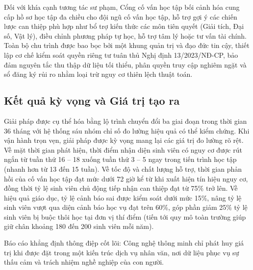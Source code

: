 Đối với khía cạnh tương tác sư phạm, Cổng cố vấn học tập bối cảnh hóa cung cấp hồ sơ học tập đa chiều cho đội ngũ cố vấn học tập, hỗ trợ gợi ý các chiến lược can thiệp phù hợp như bổ trợ kiến thức các môn tiên quyết (Giải tích, Đại số, Vật lý), điều chỉnh phương pháp tự học, hỗ trợ tâm lý hoặc tư vấn tài chính. Toàn bộ chu trình được bao bọc bởi một khung quản trị và đạo đức tin cậy, thiết lập cơ chế kiểm soát quyền riêng tư tuân thủ Nghị định 13/2023/NĐ-CP, bảo đảm nguyên tắc thu thập dữ liệu tối thiểu, phân quyền truy cập nghiêm ngặt và sổ đăng ký rủi ro nhằm loại trừ nguy cơ thiên lệch thuật toán.

\subsection*{Kết quả kỳ vọng và Giá trị tạo ra}
Giải pháp được cụ thể hóa bằng lộ trình chuyển đổi ba giai đoạn trong thời gian 36 tháng với hệ thống sáu nhóm chỉ số đo lường hiệu quả có thể kiểm chứng. Khi vận hành trọn vẹn, giải pháp được kỳ vọng mang lại các giá trị đo lường rõ rệt. Về mặt thời gian phát hiện, thời điểm nhận diện sinh viên có nguy cơ được rút ngắn từ tuần thứ 16 -- 18 xuống tuần thứ 3 -- 5 ngay trong tiến trình học tập (nhanh hơn từ 13 đến 15 tuần). Về tốc độ và chất lượng hỗ trợ, thời gian phản hồi của cố vấn học tập đạt mức dưới 72 giờ kể từ khi xuất hiện tín hiệu nguy cơ, đồng thời tỷ lệ sinh viên chủ động tiếp nhận can thiệp đạt từ 75\% trở lên. Về hiệu quả giáo dục, tỷ lệ cảnh báo sai được kiểm soát dưới mức 15\%, nâng tỷ lệ sinh viên vượt qua diện cảnh báo học vụ đạt trên 60\%, góp phần giảm 25\% tỷ lệ sinh viên bị buộc thôi học tại đơn vị thí điểm (tiến tới quy mô toàn trường giúp giữ chân khoảng 180 đến 200 sinh viên mỗi năm).

Báo cáo khẳng định thông điệp cốt lõi: Công nghệ thông minh chỉ phát huy giá trị khi được đặt trong một kiến trúc dịch vụ nhân văn, nơi dữ liệu phục vụ sự thấu cảm và trách nhiệm nghề nghiệp của con người.
